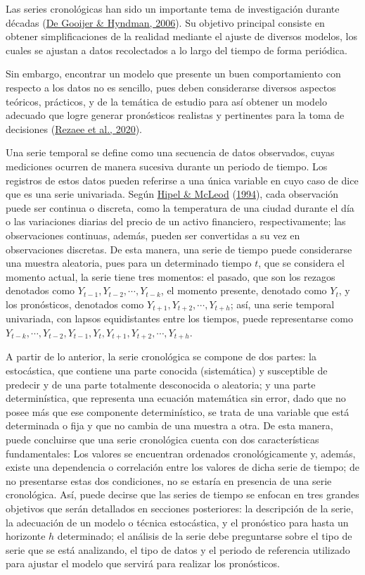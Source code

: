 \documentclass[
]{article}
\begin{document}
Las series cronológicas han sido un importante tema de investigación
durante décadas (\protect\hyperlink{ref-tsa_decades}{De Gooijer \&
Hyndman, 2006}). Su objetivo principal consiste en obtener
simplificaciones de la realidad mediante el ajuste de diversos modelos,
los cuales se ajustan a datos recolectados a lo largo del tiempo de
forma periódica.

Sin embargo, encontrar un modelo que presente un buen comportamiento con
respecto a los datos no es sencillo, pues deben considerarse diversos
aspectos teóricos, prácticos, y de la temática de estudio para así
obtener un modelo adecuado que logre generar pronósticos realistas y
pertinentes para la toma de decisiones
(\protect\hyperlink{ref-tsa_decision_making}{Rezaee et al., 2020}).

Una serie temporal se define como una secuencia de datos observados,
cuyas mediciones ocurren de manera sucesiva durante un periodo de
tiempo. Los registros de estos datos pueden referirse a una única
variable en cuyo caso de dice que es una serie univariada. Según
\protect\hyperlink{ref-Hipel}{Hipel \& McLeod}
(\protect\hyperlink{ref-Hipel}{1994}), cada observación puede ser
continua o discreta, como la temperatura de una ciudad durante el día o
las variaciones diarias del precio de un activo financiero,
respectivamente; las observaciones continuas, además, pueden ser
convertidas a su vez en observaciones discretas. De esta manera, una
serie de tiempo puede considerarse una muestra aleatoria, pues para un
determinado tiempo \(t\), que se considera el momento actual, la serie
tiene tres momentos: el pasado, que son los rezagos denotados como
\(Y_{t-1}, Y_{t-2}, \cdots, Y_{t-k}\), el momento presente, denotado
como \(Y_t\), y los pronósticos, denotados como
\(Y_{t+1}, Y_{t+2}, \cdots, Y_{t+h}\); así, una serie temporal
univariada, con lapsos equidistantes entre los tiempos, puede
representarse como
\(Y_{t-k}, \cdots, Y_{t-2}, Y_{t-1}, Y_t, Y_{t+1}, Y_{t+2}, \cdots, Y_{t+h}\).

A partir de lo anterior, la serie cronológica se compone de dos partes:
la estocástica, que contiene una parte conocida (sistemática) y
susceptible de predecir y de una parte totalmente desconocida o
aleatoria; y una parte determinística, que representa una ecuación
matemática sin error, dado que no posee más que ese componente
determinístico, se trata de una variable que está determinada o fija y
que no cambia de una muestra a otra. De esta manera, puede concluirse
que una serie cronológica cuenta con dos características fundamentales:
Los valores se encuentran ordenados cronológicamente y, además, existe
una dependencia o correlación entre los valores de dicha serie de
tiempo; de no presentarse estas dos condiciones, no se estaría en
presencia de una serie cronológica. Así, puede decirse que las series de
tiempo se enfocan en tres grandes objetivos que serán detallados en
secciones posteriores: la descripción de la serie, la adecuación de un
modelo o técnica estocástica, y el pronóstico para hasta un horizonte
\(h\) determinado; el análisis de la serie debe preguntarse sobre el
tipo de serie que se está analizando, el tipo de datos y el periodo de
referencia utilizado para ajustar el modelo que servirá para realizar
los pronósticos.
\end{document}
